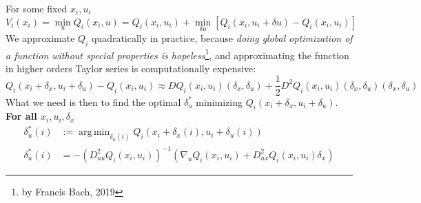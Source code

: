 \documentclass{report}
\DeclareMathOperator*{\argmin}{arg\,min}
\begin{document}
For some fixed $x_i,u_i$
\begin{equation}
\label{eq:V}
V_i(x_i) = \min_u Q_i(x_i,u) = Q_i(x_i, u_i) + \min_{\delta u} [Q_i(x_i,u_i + \delta u) - Q_i(x_i,u_i)] 
\end{equation}
We approximate $Q_i$ quadratically in practice, because \emph{doing global optimization of a function without special properties is hopeless}\footnote{by Francis Bach, 2019}, and approximating the function in higher orders Taylor series is computationally expensive: 
\begin{equation}
\label{Q approx}
Q_i(x_i + \delta_x, u_i + \delta_u )- Q_i(x_i,u_i)\approx DQ_i(x_i,u_i)(\delta_x, \delta_u) + \frac{1}{2}D^2 Q_i (x_i,u_i) (\delta_x, \delta_u)(\delta_x, \delta_u)
\end{equation}
What we need is then to find the optimal $\delta_u^*$ minimizing $Q_i(x_i + \delta_x, u_i + \delta_u )$. \textbf{For all $x_i,u_i, \delta_x$} 
\begin{equation}
\begin{split}
\delta_u^* (i) &:= \argmin_{\delta_u(i)}Q_i(x_i + \delta_x(i), u_i + \delta_u(i) ) \\
\delta_u^* (i)&= -(D^2_{uu}Q_i(x_i, u_i))^{-1} (\nabla_u Q_i(x_i,u_i) + D^2_{ux} Q_i(x_i,u_i) \delta_x)
\end{split}
\end{equation}
\end{document}
